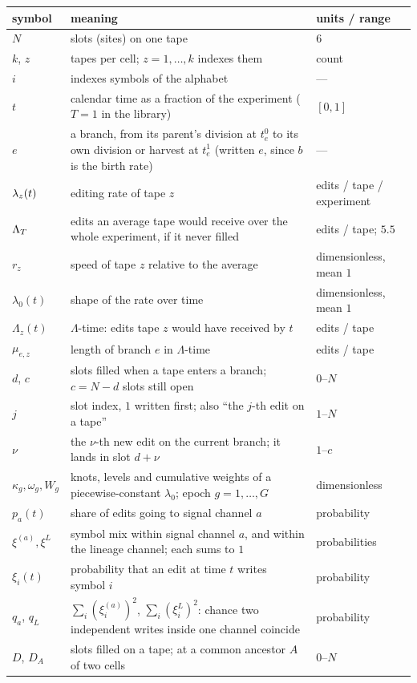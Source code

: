 \begin{center}\small
\begin{tabular}{@{}lp{}l@{}}
\toprule
symbol & meaning & units / range \\
\midrule
$N$ & slots (sites) on one tape & $6$ \\
$k$, $z$ & tapes per cell; $z=1,\dots,k$ indexes them & count \\
$i$ & indexes symbols of the alphabet & --- \\
$t$ & calendar time as a fraction of the experiment ($T=1$ in the library) & $[0,1]$ \\
$e$ & a branch, from its parent's division at $t_e^0$ to its own division or
      harvest at $t_e^1$ (written $e$, since $b$ is the birth rate) & --- \\
$\lambda_z(t)$ & editing rate of tape $z$ & edits / tape / experiment \\
$\Lambda_T$ & edits an average tape would receive over the whole experiment, if it never
          filled & edits / tape; $5.5$ \\
$r_z$ & speed of tape $z$ relative to the average & dimensionless, mean $1$ \\
$\lambda_0(t)$ & shape of the rate over time & dimensionless, mean $1$ \\
$\Lambda_z(t)$ & $\Lambda$-time: edits tape $z$ would have received by $t$ & edits / tape \\
$\mu_{e,z}$ & length of branch $e$ in $\Lambda$-time & edits / tape \\
$d$, $c$ & slots filled when a tape enters a branch; $c=N-d$ slots still open & $0$--$N$ \\
$j$ & slot index, $1$ written first; also ``the $j$-th edit on a tape'' & $1$--$N$ \\
$\nu$ & the $\nu$-th new edit on the current branch; it lands in slot $d+\nu$ & $1$--$c$ \\
$\kappa_g,\omega_g,W_g$ & knots, levels and cumulative weights of a piecewise-constant
      $\lambda_0$; epoch $g=1,\dots,G$ & dimensionless \\
$p_a(t)$ & share of edits going to signal channel $a$ & probability \\
$\xi^{(a)},\xi^{L}$ & symbol mix within signal channel $a$, and within the lineage
      channel; each sums to $1$ & probabilities \\
$\xi_i(t)$ & probability that an edit at time $t$ writes symbol $i$ & probability \\
$q_a$, $q_L$ & $\sum_i(\xi^{(a)}_i)^2$, $\sum_i(\xi^{L}_i)^2$: chance two independent writes
      inside one channel coincide & probability \\
$D$, $D_A$ & slots filled on a tape; at a common ancestor $A$ of two cells & $0$--$N$ \\
\bottomrule
\end{tabular}
\end{center}

